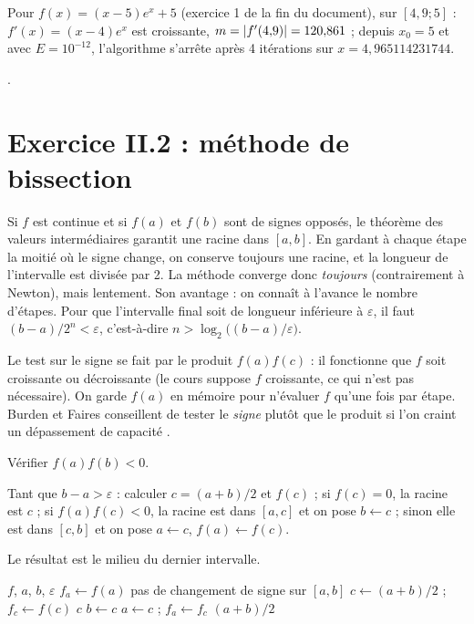 \Verif Pour $f(x) = (x-5)e^{x} + 5$ (exercice 1 de la fin du document), sur
$[4{,}9 ; 5]$ : $f'(x) = (x-4)e^{x}$ est croissante, $m = \left|f'(4{,}9)\right| =
120{,}861$ ; depuis $x_0 = 5$ et avec $E = 10^{-12}$, l'algorithme s'arrête
après 4 itérations sur $x = 4{,}965114231744$.

\Refs {}.

\section{Exercice II.2 : méthode de bissection}


\Pourquoi Si $f$ est continue et si $f(a)$ et $f(b)$ sont de signes opposés,
le théorème des valeurs intermédiaires garantit une racine dans $[a,b]$. En
gardant à chaque étape la moitié où le signe change, on conserve toujours une
racine, et la longueur de l'intervalle est divisée par 2. La méthode converge
donc \emph{toujours} (contrairement à Newton), mais lentement. Son avantage :
on connaît à l'avance le nombre d'étapes. Pour que l'intervalle final soit de
longueur inférieure à $\varepsilon$, il faut $(b-a)/2^n < \varepsilon$,
c'est-à-dire $n > \log_2\bigl((b-a)/\varepsilon\bigr)$.

Le test sur le signe se fait par le produit $f(a)f(c)$ : il fonctionne que $f$
soit croissante ou décroissante (le cours suppose $f$ croissante, ce qui
n'est pas nécessaire). On garde $f(a)$ en mémoire pour n'évaluer $f$ qu'une
fois par étape. Burden et Faires conseillent de tester le \emph{signe} plutôt
que le produit si l'on craint un dépassement de capacité .

\Etapes
{} Vérifier $f(a)f(b) < 0$.

 Tant que $b - a > \varepsilon$ : calculer $c = (a+b)/2$ et $f(c)$ ;
si $f(c) = 0$, la racine est $c$ ; si $f(a)f(c) < 0$, la racine est dans
$[a,c]$ et on pose $b \leftarrow c$ ; sinon elle est dans $[c,b]$ et on pose
$a \leftarrow c$, $f(a) \leftarrow f(c)$.

 Le résultat est le milieu du dernier intervalle.

\begin{algo}[ : bissection]
  \Require $f$, $a$, $b$, $\varepsilon$
  \State $f_a \leftarrow f(a)$
   \Print \og pas de changement de signe sur $[a,b]$ \fg{} \Stop \EndIf
    \State $c \leftarrow (a+b)/2$ ; $f_c \leftarrow f(c)$
     \Print $c$ \Stop \EndIf
     \State $b \leftarrow c$
    \Else \State $a \leftarrow c$ ; $f_a \leftarrow f_c$
    \EndIf
  \EndWhile
  \Print $(a+b)/2$
\end{algo}

